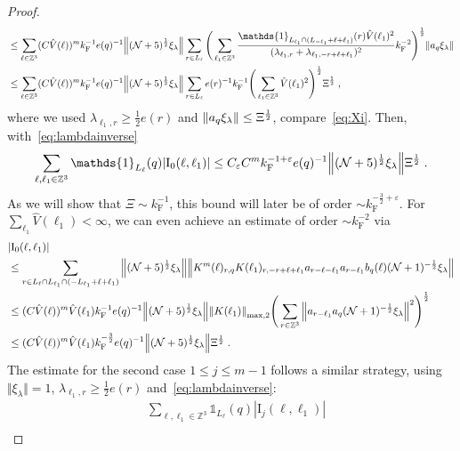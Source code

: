 \documentclass[12pt,a4paper]{article}
\numberwithin{equation}{section}
\newcommand{\1}{\mathbb{I}}
\newcommand{\F}{\mathrm{F}}
\newcommand{\I}{\mathrm{I}}
\newcommand{\kF}{k_\F}
\newcommand{\Zstar}{\mathbb{Z}^3} %
\newcommand{\Z}{\mathbb{Z}}
\newcommand{\NN}{\mathcal{N}}
\newcommand{\half}{\frac{1}{2}}
\theoremstyle{plain}
\theoremstyle{definition}
\theoremstyle{remark}
\theoremstyle{plain}
\theoremstyle{definition}
\theoremstyle{remark}
\begin{document}
\begin{proof}
\begin{align}
	 &\leq \sum_{\ell \in \Zstar} (C \hat{V}(\ell))^m \kF^{-1} e(q)^{-1}
	 	\norm{ (\NN+5)^{\half} \xi_\lambda}
	 	\sum_{r \in L_\ell} \Bigg( \sum_{\ell_1 \in \Zstar} \frac{\mathds{1}_{L_{\ell_1} \cap (L_{-\ell_1}+\ell+\ell_1)}(r) \hat{V}(\ell_1)^2}{(\lambda_{\ell_1,r} + \lambda_{\ell_1,-r+\ell+\ell_1})^2} \kF^{-2} \Bigg)^{\half} \norm{ a_q \xi_\lambda } \nonumber\\
	 &\leq \sum_{\ell \in \Zstar} (C \hat{V}(\ell))^m \kF^{-1} e(q)^{-1}
	 	\norm{ (\NN+5)^{\half} \xi_\lambda}
	 	\sum_{r \in L_\ell} e(r)^{-1} \kF^{-1} \Bigg( \sum_{\ell_1 \in \Zstar} \hat{V}(\ell_1)^2 \Bigg)^{\half} \Xi^\half \;,
\end{align}
where we used $ \lambda_{\ell_1,r} \ge \frac{1}{2} e(r) $ and $ \norm{ a_q \xi_\lambda} \le \Xi^\half $, compare~\eqref{eq:Xi}. Then, with~\eqref{eq:lambdainverse}
\begin{equation}\label{eq:estEQ1121_Coulomb}
	\sum_{\ell,\ell_1 \in \Zstar} \mathds{1}_{L_\ell}(q) |\I_0(\ell, \ell_1)|
	\leq C_\varepsilon C^m \kF^{-1+\varepsilon} e(q)^{-1}
	 	\norm{ (\NN+5)^{\half} \xi_\lambda}
	 	\Xi^{\half}	\;.
\end{equation}
As we will show that $ \Xi \sim \kF^{-1} $, this bound will later be of order $ \sim \kF^{-\frac 32 + \varepsilon} $. For $ \sum_{\ell_1} \hat{V}(\ell_1) < \infty $, we can even achieve an estimate of order $ \sim \kF^{-2} $ via
\begin{align}
	&|\I_0(\ell, \ell_1)| \nonumber\\
	&\leq \sum\limits_{r\in L_{\ell} \cap L_{\ell_1}\cap (-L_{\ell_1}+\ell+\ell_1)}
		\norm{ (\NN+5)^{\half} \xi_\lambda} 
		\norm{ K^m(\ell )_{r,q} K(\ell_1)_{r,-r+\ell+\ell_1} a_{r-\ell-\ell_1} a_{r-\ell_1} b_{q}(\ell) (\NN+1)^{-\half} \xi_\lambda }\nonumber\\
	 &\leq (C \hat{V}(\ell))^m \hat{V}(\ell_1) \kF^{-1} e(q)^{-1}
	 	\norm{ (\NN+5)^{\half} \xi_\lambda} \norm{K(\ell_1) }_{\max,2}
	 	\Bigg( \sum\limits_{r\in \Z^3} \norm{ a_{r-\ell_1} a_q (\NN+1)^{-\half} \xi_\lambda }^2 \Bigg)^\half \nonumber\\
	 &\leq (C \hat{V}(\ell))^m \hat{V}(\ell_1)
	 	\kF^{-\frac 32} e(q)^{-1}
	 	\norm{(\NN+5)^{\half} \xi_\lambda}
	 	\Xi^{\half} \;.
\label{eq:estEQ1121}
\end{align}
The estimate for the second case $ 1 \le j \le m-1 $ follows a similar strategy, using $ \Vert \xi_\lambda \Vert = 1 $, $ \lambda_{\ell_1,r} \ge \frac{1}{2} e(r) $ and~\eqref{eq:lambdainverse}:
\begin{align}
	&\sum_{\ell,\ell_1 \in \Zstar} \mathds{1}_{L_\ell}(q) |\I_j(\ell, \ell_1)| \nonumber\\

\end{align}
\end{proof}
\end{document}
